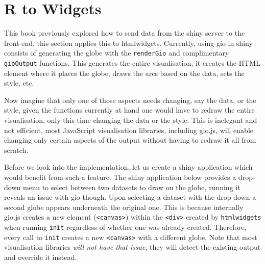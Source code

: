 \documentclass[
]{krantz}
\begin{document}
\hypertarget{shiny-widgets-r-to-widgets}{%
\section{R to Widgets}\label{shiny-widgets-r-to-widgets}}

This book previously explored how to send data from the shiny server to the front-end, this section applies this to htmlwidgets. Currently, using gio in shiny consists of generating the globe with the \texttt{renderGio} and complimentary \texttt{gioOutput} functions. This generates the entire visualisation, it creates the HTML element where it places the globe, draws the arcs based on the data, sets the style, etc.

Now imagine that only one of those aspects needs changing, say the data, or the style, given the functions currently at hand one would have to redraw the entire visualisation, only this time changing the data or the style. This is inelegant and not efficient, most JavaScript visualisation libraries, including gio.js, will enable changing only certain aspects of the output without having to redraw it all from scratch.

Before we look into the implementation, let us create a shiny application which would benefit from such a feature. The shiny application below provides a drop-down menu to select between two datasets to draw on the globe, running it reveals an issue with gio though. Upon selecting a dataset with the drop down a second globe appears underneath the original one. This is because internally gio.js creates a new element (\texttt{\textless{}canvas\textgreater{}}) within the \texttt{\textless{}div\textgreater{}} created by \texttt{htmlwidgets} when running \texttt{init} regardless of whether one was already created. Therefore, every call to \texttt{init} creates a new \texttt{\textless{}canvas\textgreater{}} with a different globe. Note that most visualisation libraries \emph{will not have that issue}, they will detect the existing output and override it instead.
\end{document}
